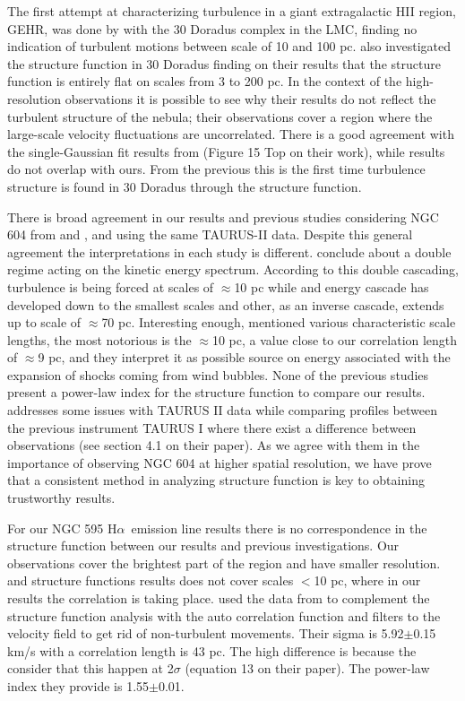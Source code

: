 \documentclass[fleqn,usenatbib, useAMS, a4paper]{mnras}
\newcommand\halpha{H${\alpha}$}
\begin{document}
The first attempt at characterizing turbulence in a giant extragalactic HII region, GEHR, was done by \citet{1961MNRAS.122....1F} with the 30 Doradus complex in the LMC, finding no indication of turbulent motions between scale of 10 and 100 pc.
\citet{2019arXiv191203543M} also investigated the structure function in 30 Doradus finding on their results that the structure function is entirely flat on scales from 3 to 200 pc.
In the context of the high-resolution observations it is possible to see why their results do not reflect the turbulent structure of the nebula; their observations cover a region where the large-scale velocity fluctuations are uncorrelated.
There is a good agreement with the single-Gaussian fit results from \citet{2019arXiv191203543M} (Figure 15 Top on their work), while \citet{1961MNRAS.122....1F} results do not overlap with ours.
From the previous this is the first time turbulence structure is found in 30 Doradus through the structure function.

There is broad agreement in our results and previous studies considering NGC 604 from \citet{tanco1997} and \citet{2019arXiv191203543M}, and using the same TAURUS-II data.
Despite this general agreement the interpretations in each study is different.
\citet{tanco1997} conclude about a double regime acting on the kinetic energy spectrum.
According to this double cascading, turbulence is being forced at scales of \(\approx\)10 pc while and energy cascade has developed down to the smallest scales and other, as an inverse cascade, extends up to scale of \(\approx\)70 pc.
Interesting enough, \citet{tanco1997} mentioned various characteristic scale lengths, the most notorious is the \(\approx\)10 pc, a value close to our correlation length of \(\approx\)9 pc, and they interpret it as possible source on energy associated with the expansion of shocks coming from wind bubbles.  
None of the previous studies present a power-law index for the structure function to compare our results.
\citet{2019arXiv191203543M} addresses some issues with TAURUS II data while comparing profiles between the previous instrument TAURUS I where there exist a difference between observations (see section 4.1 on their paper).
As we agree with them in the importance of observing NGC 604 at higher spatial resolution, we have prove that a consistent method in analyzing structure function is key to obtaining trustworthy results.

For our NGC 595 \halpha\ emission line results there is no correspondence in the structure function between our results and previous investigations.
Our observations cover the brightest part of the region and have smaller resolution.
\citet{lagrois2009multi} and \citet{lagrois2011} structure functions results does not cover scales $<$10 pc, where in our results the correlation is taking place.
\citet{lagrois2011} used the data from \citet{lagrois2009multi} to complement the structure function analysis with the auto correlation function and filters to the velocity field to get rid of non-turbulent movements.
Their sigma is 5.92$\pm$0.15 km/s with a correlation length is 43 pc.
The high difference is because the consider that this happen at 2$\sigma$ (equation 13 on their paper).
The power-law index they provide is 1.55$\pm$0.01.
\end{document}
